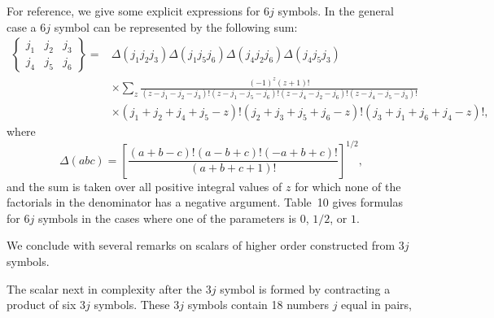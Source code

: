For reference, we give some explicit expressions for $6j$ symbols. In the general case a $6j$ symbol can be represented by the following sum:
\begingroup\footnotesize
\begin{equation}
\begin{aligned}
\left\{\begin{matrix}j_1&j_2&j_3\\j_4&j_5&j_6\end{matrix}\right\}
={}&\Delta(j_1j_2j_3)\Delta(j_1j_5j_6)\Delta(j_4j_2j_6)\Delta(j_4j_5j_3)\\
&\times\sum_z\frac{(-1)^z(z+1)!}{(z-j_1-j_2-j_3)!(z-j_1-j_5-j_6)!(z-j_4-j_2-j_6)!(z-j_4-j_5-j_3)!}\\
&\times(j_1+j_2+j_4+j_5-z)!(j_2+j_3+j_5+j_6-z)!(j_3+j_1+j_6+j_4-z)! ,
\end{aligned}
\tag{108.10}
\end{equation}
\endgroup
where
\[
\Delta(abc)=\left[\frac{(a+b-c)!(a-b+c)!(-a+b+c)!}{(a+b+c+1)!}\right]^{1/2},
\]
and the sum is taken over all positive integral values of $z$ for which none of the factorials in the denominator has a negative argument. Table~10 gives formulas for $6j$ symbols in the cases where one of the parameters is $0$, $1/2$, or $1$.

We conclude with several remarks on scalars of higher order constructed from $3j$ symbols.

The scalar next in complexity after the $3j$ symbol is formed by contracting a product of six $3j$ symbols. These $3j$ symbols contain 18 numbers $j$ equal in pairs,

